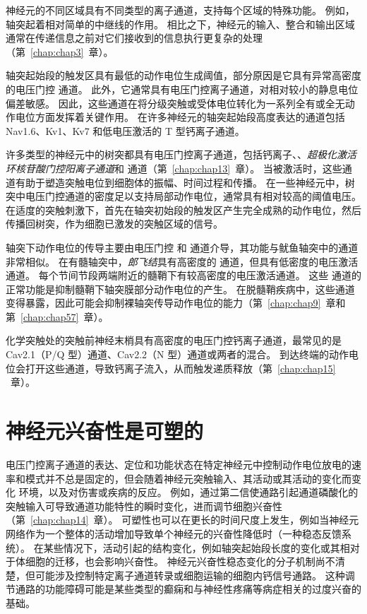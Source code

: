 神经元的不同区域具有不同类型的离子通道，支持每个区域的特殊功能。
例如，轴突起着相对简单的中继线的作用。
相比之下，神经元的输入、整合和输出区域通常在传递信息之前对它们接收到的信息执行更复杂的处理（第~\ref{chap:chap3}~章）。


轴突起始段的触发区具有最低的动作电位生成阈值，部分原因是它具有异常高密度的电压门控  通道。
此外，它通常具有电压门控离子通道，对相对较小的静息电位偏差敏感。
因此，这些通道在将分级突触或受体电位转化为一系列全有或全无动作电位方面发挥着关键作用。
在许多神经元的轴突起始段高度表达的通道包括 Nav1.6、Kv1、Kv7 和低电压激活的 T 型钙离子通道。


许多类型的神经元中的树突都具有电压门控离子通道，包括钙离子、、\textit{超极化激活环核苷酸门控阳离子通道}和  通道（第~\ref{chap:chap13}~章）。
当被激活时，这些通道有助于塑造突触电位到细胞体的振幅、时间过程和传播。
在一些神经元中，树突中电压门控通道的密度足以支持局部动作电位，通常具有相对较高的阈值电压。
在适度的突触刺激下，首先在轴突初始段的触发区产生完全成熟的动作电位，然后传播回树突，作为细胞已激发的突触区域的信号。


轴突下动作电位的传导主要由电压门控  和  通道介导，其功能与鱿鱼轴突中的通道非常相似。
在有髓轴突中，\textit{郎飞结}具有高密度的  通道，但具有低密度的电压激活  通道。
每个节间节段两端附近的髓鞘下有较高密度的电压激活通道。
这些  通道的正常功能是抑制髓鞘下轴突膜部分动作电位的产生。
在脱髓鞘疾病中，这些通道变得暴露，因此可能会抑制裸轴突传导动作电位的能力（第~\ref{chap:chap9}~章和第~\ref{chap:chap57}~章）。


化学突触处的突触前神经末梢具有高密度的电压门控钙离子通道，最常见的是 Cav2.1（P/Q 型）通道、Cav2.2（N 型）通道或两者的混合。
到达终端的动作电位会打开这些通道，导致钙离子流入，从而触发递质释放（第~\ref{chap:chap15} ~章）。



\section{神经元兴奋性是可塑的}

电压门控离子通道的表达、定位和功能状态在特定神经元中控制动作电位放电的速率和模式并不总是固定的，但会随着神经元突触输入、其活动或其活动的变化而变化 环境，以及对伤害或疾病的反应。
例如，通过第二信使通路引起通道磷酸化的突触输入可导致通道功能特性的瞬时变化，进而调节细胞兴奋性（第~\ref{chap:chap14}~章）。
可塑性也可以在更长的时间尺度上发生，例如当神经元网络作为一个整体的活动增加导致单个神经元的兴奋性降低时（一种稳态反馈系统）。
在某些情况下，活动引起的结构变化，例如轴突起始段长度的变化或其相对于体细胞的迁移，也会影响兴奋性。
神经元兴奋性稳态变化的分子机制尚不清楚，但可能涉及控制特定离子通道转录或细胞运输的细胞内钙信号通路。 
这种调节通路的功能障碍可能是某些类型的癫痫和与神经性疼痛等病症相关的过度兴奋的基础。





